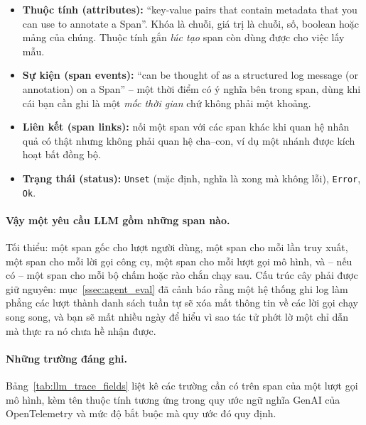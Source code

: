 \begin{itemize}
	\item \textbf{Thuộc tính (attributes):} ``key-value pairs that contain metadata that you can use to annotate a Span''. Khóa là chuỗi, giá trị là chuỗi, số, boolean hoặc mảng của chúng. Thuộc tính gắn \emph{lúc tạo} span còn dùng được cho việc lấy mẫu.
	\item \textbf{Sự kiện (span events):} ``can be thought of as a structured log message (or annotation) on a Span'' -- một thời điểm có ý nghĩa bên trong span, dùng khi cái bạn cần ghi là một \emph{mốc thời gian} chứ không phải một khoảng.
	\item \textbf{Liên kết (span links):} nối một span với các span khác khi quan hệ nhân quả có thật nhưng không phải quan hệ cha--con, ví dụ một nhánh được kích hoạt bất đồng bộ.
	\item \textbf{Trạng thái (status):} \texttt{Unset} (mặc định, nghĩa là xong mà không lỗi), \texttt{Error}, \texttt{Ok}.
\end{itemize}

\paragraph{Vậy một yêu cầu LLM gồm những span nào.} Tối thiểu: một span gốc cho lượt người dùng, một span cho mỗi lần truy xuất, một span cho mỗi lời gọi công cụ, một span cho mỗi lượt gọi mô hình, và -- nếu có -- một span cho mỗi bộ chấm hoặc rào chắn chạy sau. Cấu trúc cây phải được giữ nguyên: mục~\ref{ssec:agent_eval} đã cảnh báo rằng một hệ thống ghi log làm phẳng các lượt thành danh sách tuần tự sẽ xóa mất thông tin về các lời gọi chạy song song, và bạn sẽ mất nhiều ngày để hiểu vì sao tác tử phớt lờ một chỉ dẫn mà thực ra nó chưa hề nhận được.

\paragraph{Những trường đáng ghi.} Bảng~\ref{tab:llm_trace_fields} liệt kê các trường cần có trên span của một lượt gọi mô hình, kèm tên thuộc tính tương ứng trong quy ước ngữ nghĩa GenAI của OpenTelemetry \cite{otel2026genaisemconv} và mức độ bắt buộc mà quy ước đó quy định.

